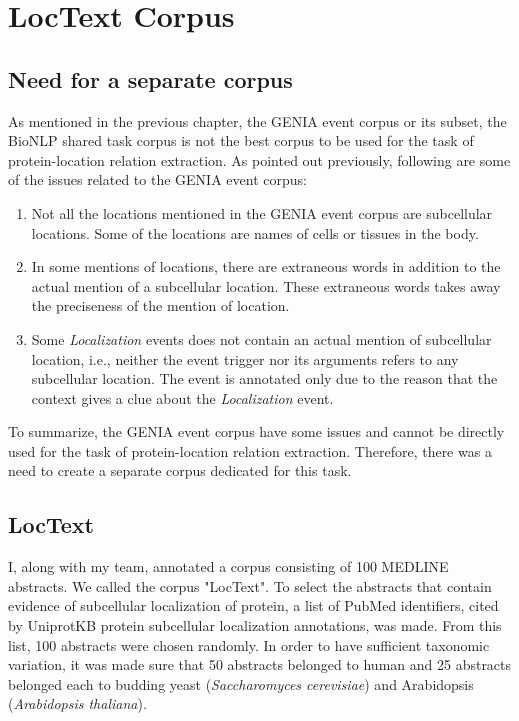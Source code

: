 \chapter{LocText Corpus}\label{chapter:corpus}

\section{Need for a separate corpus}

As mentioned in the previous chapter, the GENIA event corpus or its subset, the BioNLP shared task corpus is not the best corpus to be used for the task of protein-location relation extraction. As pointed out previously, following are some of the issues related to the GENIA event corpus:

\begin{enumerate}

\item Not all the locations mentioned in the GENIA event corpus are subcellular locations. Some of the locations are names of cells or tissues in the body.

\item In some mentions of locations, there are extraneous words in addition to the actual  mention of a subcellular location. These extraneous words takes away the preciseness of the mention of location.

\item Some \textit{Localization} events does not contain an actual mention of subcellular location, i.e., neither the event trigger nor its arguments refers to any subcellular location. The event is annotated only due to the reason that the context gives a clue about the \textit{Localization} event.

\end{enumerate}

To summarize, the GENIA event corpus have some issues and cannot be directly used for the task of protein-location relation extraction. Therefore, there was a need to create a separate corpus dedicated for this task.

\section{LocText}\label{sec:LocTextCorpus}

I, along with my team, annotated a corpus consisting of 100 MEDLINE \cite{medline} abstracts. We called the corpus "LocText". To select the abstracts that contain evidence of subcellular localization of protein, a list of PubMed \cite{pubmed} identifiers, cited by UniprotKB \cite{magrane2011uniprot} protein subcellular localization annotations, was made. From this list, 100 abstracts were chosen randomly. In order to have sufficient taxonomic variation, it was made sure that 50 abstracts belonged to human and 25 abstracts belonged each to budding yeast (\textit{Saccharomyces cerevisiae}) and Arabidopsis (\textit{Arabidopsis thaliana}).

